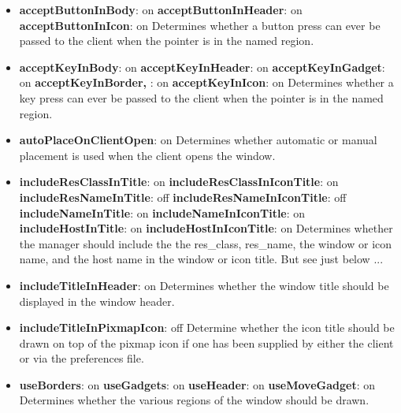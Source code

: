 \begin{itemize}
\item {\bf acceptButtonInBody}: on\newline{}
{\bf acceptButtonInHeader}: on\newline{}
{\bf acceptButtonInIcon}: on\newline{}
Determines whether a button press can ever be passed to the
client when the pointer is in the named region.

\item {\bf acceptKeyInBody}: on\newline{}
{\bf acceptKeyInHeader}: on\newline{}
{\bf acceptKeyInGadget}: on\newline{}
{\bf acceptKeyInBorder, }: on\newline{}
{\bf acceptKeyInIcon}: on\newline{}
Determines whether a key press can ever be passed to the
client when the pointer is in the named region.

\item {\bf autoPlaceOnClientOpen}: on\newline{}
Determines whether automatic or manual placement is used when the
client opens the window.

\item {\bf includeResClassInTitle}: on\newline{}
{\bf includeResClassInIconTitle}: on\newline{}
{\bf includeResNameInTitle}: off\newline{}
{\bf includeResNameInIconTitle}: off\newline{}
{\bf includeNameInTitle}: on\newline{}
{\bf includeNameInIconTitle}: on\newline{}
{\bf includeHostInTitle}: on\newline{}
{\bf includeHostInIconTitle}: on\newline{}
Determines whether the manager should include the the res\_class,
res\_name, the window or icon name, and the host name in the window or
icon title.
But see just below ...

\item {\bf includeTitleInHeader}: on\newline{}
Determines whether the window title should be displayed in the window
header.

\item {\bf includeTitleInPixmapIcon}: off\newline{}
Determine whether the icon title should be drawn on top of the pixmap
icon if one has been supplied by either the client or via the preferences
file.

\item {\bf useBorders}: on\newline{}
{\bf useGadgets}: on\newline{}
{\bf useHeader}: on\newline{}
{\bf useMoveGadget}: on\newline{}
Determines whether the various regions of the window should be
drawn.

\end{itemize}

